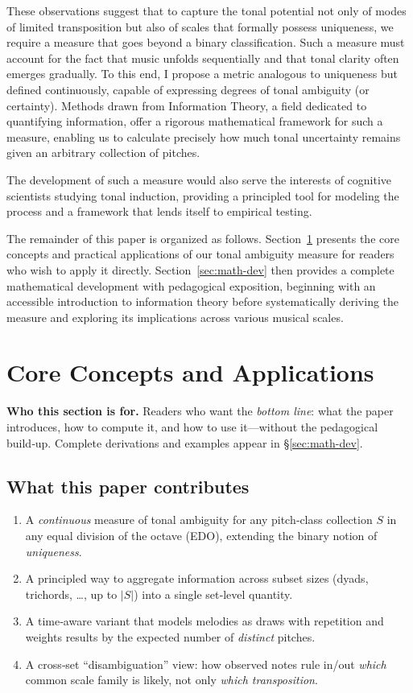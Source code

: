 \documentclass[10pt,twocolumn]{article}
\numberwithin{equation}{section} %
\begin{document}
    These observations suggest that to capture the tonal potential not only of modes of limited transposition but also of scales that formally possess uniqueness, we require a measure that goes beyond a binary classification.
    Such a measure must account for the fact that music unfolds sequentially and that tonal clarity often emerges gradually.
    To this end, I propose a metric analogous to uniqueness but defined continuously, capable of expressing degrees of tonal ambiguity (or certainty).
    Methods drawn from Information Theory, a field dedicated to quantifying information, offer a rigorous mathematical framework for such a measure, enabling us to calculate precisely how much tonal uncertainty remains given an arbitrary collection of pitches.

    The development of such a measure would also serve the interests of cognitive scientists studying tonal induction, providing a principled tool for modeling the process and a framework that lends itself to empirical testing.



    The remainder of this paper is organized as follows.
    Section~\ref{sec:core} presents the core concepts and practical applications of our tonal ambiguity measure for readers who wish to apply it directly.
    Section~\ref{sec:math-dev} then provides a complete mathematical development with pedagogical exposition, beginning with an accessible introduction to information theory before systematically deriving the measure and exploring its implications across various musical scales.

    \section{Core Concepts and Applications}\label{sec:core}

    \noindent\textbf{Who this section is for.}
    Readers who want the \emph{bottom line}: what the paper introduces, how to compute it, and how to use it—without the pedagogical build‑up.
Complete derivations and examples appear in \S\ref{sec:math-dev}.

    \subsection*{What this paper contributes}
    \begin{enumerate}
        \item A \emph{continuous} measure of tonal ambiguity for any pitch‑class collection $S$ in any equal division of the octave (EDO), extending the binary notion of \emph{uniqueness}.
        \item A principled way to aggregate information across subset sizes (dyads, trichords, \dots, up to $|S|$) into a single set‑level quantity.
        \item A time‑aware variant that models melodies as draws with repetition and weights results by the expected number of \emph{distinct} pitches.
        \item A cross‑set ``disambiguation'' view: how observed notes rule in/out \emph{which} common scale family is likely, not only \emph{which transposition}.
    \end{enumerate}
\end{document}
